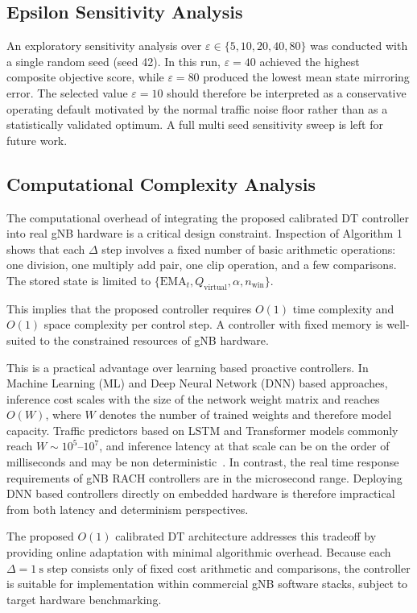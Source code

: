 \documentclass[conference]{IEEEtran}
\newcommand{\qvirt}{Q_{\mathrm{virtual}}}
\newcommand{\ema}{\mathrm{EMA}}
\begin{document}
\subsection{Epsilon Sensitivity Analysis}

An exploratory sensitivity analysis over $\varepsilon \in \{5, 10, 20, 40, 80\}$ was conducted with a single random seed (seed 42). In this run, $\varepsilon = 40$ achieved the highest composite objective score, while $\varepsilon = 80$ produced the lowest mean state mirroring error. The selected value $\varepsilon = 10$ should therefore be interpreted as a conservative operating default motivated by the normal traffic noise floor rather than as a statistically validated optimum. A full multi seed sensitivity sweep is left for future work.

\subsection{Computational Complexity Analysis}

The computational overhead of integrating the proposed calibrated DT controller into real gNB hardware is a critical design constraint. Inspection of Algorithm 1 shows that each $\Delta$ step involves a fixed number of basic arithmetic operations: one division, one multiply add pair, one clip operation, and a few comparisons. The stored state is limited to $\{\ema_t, \qvirt, \alpha, n_{\mathrm{win}}\}$.

This implies that the proposed controller requires $O(1)$ time complexity and $O(1)$ space complexity per control step. A controller with fixed memory is well-suited to the constrained resources of gNB hardware.

This is a practical advantage over learning based proactive controllers. In Machine Learning (ML) and Deep Neural Network (DNN) based approaches, inference cost scales with the size of the network weight matrix and reaches $O(W)$, where $W$ denotes the number of trained weights and therefore model capacity. Traffic predictors based on LSTM and Transformer models commonly reach $W \sim 10^5$--$10^7$, and inference latency at that scale can be on the order of milliseconds and may be non deterministic~\cite{b9}. In contrast, the real time response requirements of gNB RACH controllers are in the microsecond range. Deploying DNN based controllers directly on embedded hardware is therefore impractical from both latency and determinism perspectives.

The proposed $O(1)$ calibrated DT architecture addresses this tradeoff by providing online adaptation with minimal algorithmic overhead. Because each $\Delta = 1\ \mathrm{s}$ step consists only of fixed cost arithmetic and comparisons, the controller is suitable for implementation within commercial gNB software stacks, subject to target hardware benchmarking.
\end{document}
